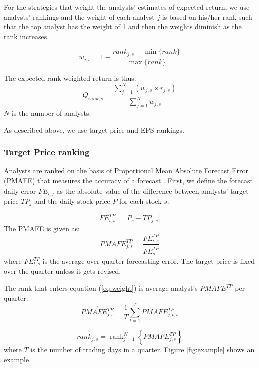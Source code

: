 \documentclass{article}\usepackage[]{graphicx}\usepackage[]{color}
\DeclareMathOperator{\rank}{rank}
\begin{document}
For the strategies that weight the analysts' estimates of expected return, we use analysts' rankings and the weight of each analyst $j$ is based on his/her rank such that the top analyst has the weight of 1 and then the weights diminish as the rank increases.


\begin{equation}
\label{eq:weight}
w_{j,s}=1-\frac{rank_{j,s}-\min{ \{rank \} }}{\max{\{rank \}}}
\end{equation}

The expected rank-weighted return is thus:
\begin{equation}
\label{rankq}
Q_{rank,s}=\frac{\sum_{j=1}^{N} (w_{j,s} \times r_{j,s})}{\sum_{j=1}^{N} w_{j,s}}
\end{equation}
$N$ is the number of analysts.

As described above, we use target price and EPS rankings.

\subsubsection{Target Price ranking} 

Analysts are ranked on the basis of Proportional Mean Absolute Forecast Error (PMAFE) that measures the accuracy of a forecast  \citep{clement1999,brown2001,ertimur2007}. First,  we define the forecast daily error  $FE_{i,j}$ as the absolute value of the difference between analysts' target price $TP_{j}$ and the daily stock price $P$ for each stock $s$:

\begin{equation}
\label{dfe}
FE_{i,s}^{TP}=|{P_{s}-TP_{j,s}}|
\end{equation}
The PMAFE is given as:
\begin{equation}
\label{tp:pmafe}
PMAFE_{j,s}^{TP}=\frac{FE_{i,s}^{TP}}{\overline{FE_{s}^{TP}}}
\end{equation}
where $\overline{{FE}_{t,s}^{TP}}$ is the average over quarter forecasting error. The target price is fixed over the quarter unless it gets revised.

The rank  that enters equation (\ref{eq:weight}) is average analyst's $PMAFE^{TP}$ per quarter:
\begin{equation}
\overline{PMAFE_{j,s}^{TP}}=\frac{1}{T} \sum_{t=1}^{T} PMAFE_{j,t,s}^{TP}
\end{equation}

\begin{equation}
\label{tp:rank}
rank_{j,s}=\rank_{j=1}^{N} \left\{ \overline{PMAFE_{j,s}^{TP}} \right\}
\end{equation}
where $T$ is the number of trading days in a quarter. Figure \ref{fig:example} shows an example.
\end{document}
